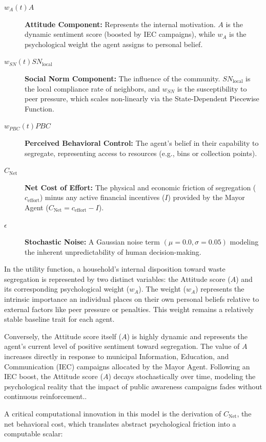 \begin{description}
    \item[$w_A(t) A$] \textbf{Attitude Component:} Represents the internal motivation. $A$ is the dynamic sentiment score (boosted by IEC campaigns), while $w_A$ is the psychological weight the agent assigns to personal belief.
    \item[$w_{SN}(t) SN_{\mathrm{local}}$] \textbf{Social Norm Component:} The influence of the community. $SN_{\mathrm{local}}$ is the local compliance rate of neighbors, and $w_{SN}$ is the susceptibility to peer pressure, which scales non-linearly via the State-Dependent Piecewise Function.
    \item[$w_{PBC}(t) PBC$] \textbf{Perceived Behavioral Control:} The agent's belief in their capability to segregate, representing access to resources (e.g., bins or collection points).
    \item[$C_{\mathrm{Net}}$] \textbf{Net Cost of Effort:} The physical and economic friction of segregation ($c_{\text{effort}}$) minus any active financial incentives ($I$) provided by the Mayor Agent ($C_{\mathrm{Net}} = c_{\text{effort}} - I$).
    \item[$\epsilon$] \textbf{Stochastic Noise:} A Gaussian noise term $(\mu=0.0, \sigma=0.05)$ modeling the inherent unpredictability of human decision-making.
\end{description}

In the utility function, a household's internal disposition toward waste segregation is represented by two distinct variables: the Attitude score ($A$) and its corresponding psychological weight ($w_A$). The weight ($w_A$) represents the intrinsic importance an individual places on their own personal beliefs relative to external factors like peer pressure or penalties. This weight remains a relatively stable baseline trait for each agent.

Conversely, the Attitude score itself ($A$) is highly dynamic and represents the agent's current level of positive sentiment toward segregation. The value of $A$ increases directly in response to municipal Information, Education, and Communication (IEC) campaigns allocated by the Mayor Agent. Following an IEC boost, the Attitude score ($A$) decays stochastically over time, modeling the psychological reality that the impact of public awareness campaigns fades without continuous reinforcement..

A critical computational innovation in this model is the derivation of $C_{\mathrm{Net}}$, the net behavioral cost, which translates abstract psychological friction into a computable scalar:

